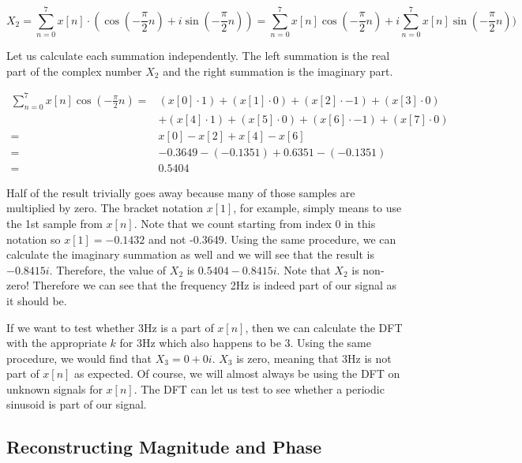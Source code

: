$$X_2 = \sum_{n = 0}^{7}x[n] \cdot (\cos{(-\frac{\pi}{2}n)} +  i\sin(-\frac{\pi}{2}n)) = 
\sum_{n = 0}^{7}x[n]\cos{(-\frac{\pi}{2}n)} + i\sum_{n = 0}^{7}x[n]\sin(-\frac{\pi}{2}n))$$

Let us calculate each summation independently.  The left summation is the real part of the complex number $X_2$
and the right summation is the imaginary part.  

\begin{align*}
	\sum_{n = 0}^{7}x[n]\cos{(-\frac{\pi}{2}n)} =  & (x[0] \cdot 1) + (x[1] \cdot 0) + (x[2] \cdot -1) + (x[3] \cdot 0)\\
	& + (x[4] \cdot 1) + (x[5] \cdot 0) + (x[6] \cdot -1) + (x[7] \cdot 0)\\
	=  & x[0] - x[2] + x[4] - x[6] \\
	=  & -0.3649 - (-0.1351) + 0.6351 - (-0.1351) \\
	= & 0.5404
\end{align*}

Half of the result trivially goes away because many of those samples are multiplied by zero.  The bracket notation
$x[1]$, for example, simply means to use the 1st sample from $x[n]$.  Note that we count starting from index 0
in this notation so $x[1] = -0.1432$ and not -0.3649.  Using the same procedure, we can calculate
the imaginary summation as well and we will see that the result is $-0.8415i$.  Therefore, the value of 
$X_2$ is $0.5404 - 0.8415i$.  Note that $X_2$ is non-zero!  Therefore we can see that the frequency 2Hz is
indeed part of our signal as it should be.

If we want to test whether 3Hz is a part of $x[n]$, then we can calculate the DFT with the appropriate $k$ for
3Hz which also happens to be 3.  Using the same procedure, we would find that $X_3 = 0 + 0i$.  $X_3$ is
zero, meaning that 3Hz is not part of $x[n]$ as expected.  Of course, we will almost always be using the
DFT on unknown signals for $x[n]$.  The DFT can let us test to see whether a periodic sinusoid is part of our
signal.

\subsection*{Reconstructing Magnitude and Phase}

